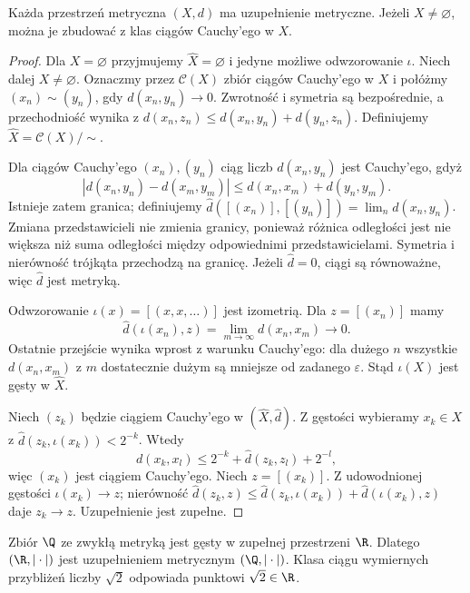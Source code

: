 \begin{twierdzenie}
\label{thm:topog-uzupelnienia-metryczne}
Każda przestrzeń metryczna $(X,d)$ ma uzupełnienie
metryczne. Jeżeli $X\ne\varnothing$,
można je zbudować z klas ciągów Cauchy'ego w $X$.
\end{twierdzenie}
\begin{proof}
Dla $X=\varnothing$ przyjmujemy $\widehat X=\varnothing$
i jedyne możliwe odwzorowanie $\iota$.
Niech dalej $X\ne\varnothing$. Oznaczmy przez
$\mathcal C(X)$ zbiór ciągów Cauchy'ego w $X$
i połóżmy $(x_n)\sim(y_n)$, gdy
$d(x_n,y_n)\to0$. Zwrotność i symetria są
bezpośrednie, a przechodniość wynika z
$d(x_n,z_n)\le d(x_n,y_n)+d(y_n,z_n)$.
Definiujemy $\widehat X=\mathcal C(X)/{\sim}$.

Dla ciągów Cauchy'ego $(x_n),(y_n)$
ciąg liczb $d(x_n,y_n)$ jest Cauchy'ego, gdyż
\[
 |d(x_n,y_n)-d(x_m,y_m)|
 \le d(x_n,x_m)+d(y_n,y_m).
\]
Istnieje zatem granica; definiujemy
$\widehat d([(x_n)],[(y_n)])=\lim_nd(x_n,y_n)$.
Zmiana przedstawicieli nie zmienia granicy,
ponieważ różnica odległości jest nie większa
niż suma odległości między odpowiednimi
przedstawicielami. Symetria i nierówność
trójkąta przechodzą na granicę.
Jeżeli $\widehat d=0$, ciągi są równoważne,
więc $\widehat d$ jest metryką.

Odwzorowanie $\iota(x)=[(x,x,\ldots)]$
jest izometrią. Dla $z=[(x_n)]$ mamy
\[
 \widehat d(\iota(x_n),z)=\lim_{m\to\infty}d(x_n,x_m)
 \longrightarrow0.
\]
Ostatnie przejście wynika wprost z warunku
Cauchy'ego: dla dużego $n$ wszystkie
$d(x_n,x_m)$ z $m$ dostatecznie dużym
są mniejsze od zadanego $\varepsilon$.
Stąd $\iota(X)$ jest gęsty w $\widehat X$.

Niech $(z_k)$ będzie ciągiem Cauchy'ego
w $(\widehat X,\widehat d)$.
Z gęstości wybieramy $x_k\in X$ z
$\widehat d(z_k,\iota(x_k))<2^{-k}$.
Wtedy
\[
 d(x_k,x_l)\le
 2^{-k}+\widehat d(z_k,z_l)+2^{-l},
\]
więc $(x_k)$ jest ciągiem Cauchy'ego.
Niech $z=[(x_k)]$. Z udowodnionej gęstości
$\iota(x_k)\to z$; nierówność
$\widehat d(z_k,z)\le
\widehat d(z_k,\iota(x_k))+
\widehat d(\iota(x_k),z)$
daje $z_k\to z$. Uzupełnienie jest zupełne.
\end{proof}

\begin{przyklad}
\label{ex:topog-uzupelnienia-q}
Zbiór $\Q$ ze zwykłą metryką jest gęsty w
zupełnej przestrzeni $\R$. Dlatego
$(\R,|\cdot|)$ jest uzupełnieniem metrycznym
$(\Q,|\cdot|)$. Klasa ciągu wymiernych
przybliżeń liczby $\sqrt2$ odpowiada
punktowi $\sqrt2\in\R$.
\end{przyklad}

